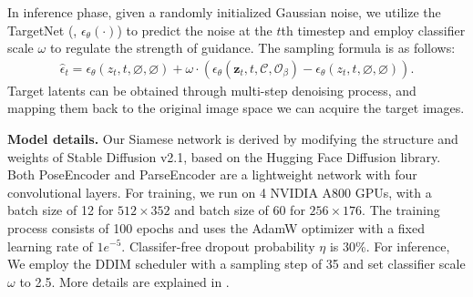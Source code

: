 In inference phase, given a randomly initialized Gaussian noise, we utilize the TargetNet (\ie, $\epsilon_\theta(\cdot)$) to predict the noise at the $t$th timestep and employ classifier scale $\omega$ to regulate the strength of guidance. The sampling formula is as follows:
\begin{align} 
    \label{eq:inference}
    \hat{\epsilon}_{t}=\epsilon_{\theta}(z_t,t,\varnothing,\varnothing) + \omega \cdot(\epsilon_{\theta} (\mathbf{z}_t,t,\mathcal{C},\mathcal{O}_{\beta})-\epsilon_{\theta}(z_t,t,\varnothing,\varnothing)).
\end{align}
Target latents can be obtained through multi-step denoising process, and mapping them back to the original image space we can acquire the target images. 


\textbf{Model details.}
Our Siamese network is derived by modifying the structure and weights of Stable Diffusion v2.1, based on the Hugging Face Diffusion library. Both PoseEncoder and ParseEncoder are a lightweight network with four convolutional layers. 
For training, we run on 4 NVIDIA A800 GPUs, with a batch size of 12 for $512\times 352$ and batch size of 60 for $256\times 176$. The training process consists of 100 epochs and uses the AdamW optimizer with a fixed learning rate of $1e^{-5}$. Classifer-free dropout probability $\eta$ is 30\%. For inference, We employ the DDIM\cite{ho2020denoising} scheduler with a sampling step of 35 and set classifier scale $\omega$ to 2.5. More details are explained in .
%
